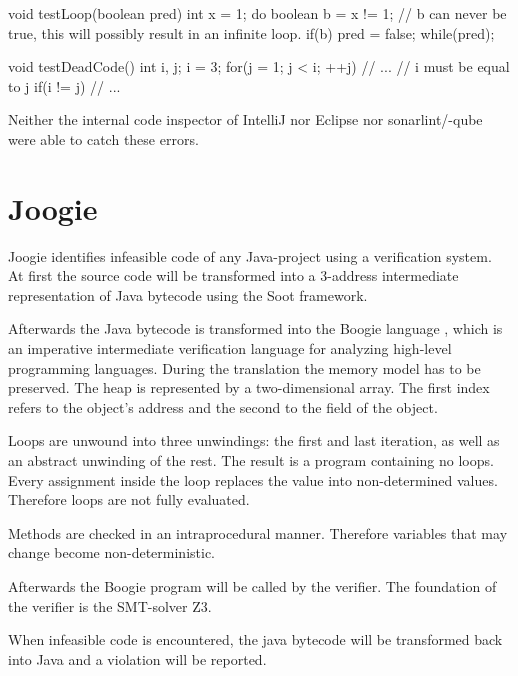 \begin{program}[h!]
	\begin{JavaCode}
void testLoop(boolean pred) {
	int x = 1;
	do {
		boolean b = x != 1;
		// b can never be true, this will possibly result in an infinite loop.
		if(b) {
			pred = false;
		}
	} while(pred);
}

void testDeadCode() {
	int i, j;
	i = 3;
	for(j = 1; j < i; ++j) {
		// ...
	}
	// i must be equal to j
	if(i != j) { 
		// ...
	}
}\end{JavaCode}
	\caption{Neither the internal code inspector of IntelliJ nor Eclipse nor sonarlint/-qube were able to catch these errors. }
	\label{code:Java sonarqube hard example}
\end{program}

\clearpage
\section{Joogie}
\label{sec:sca paper}
Joogie \cite{arltJoogieInfeasibleCode2012, arltJoogieJavaJimple2013} identifies infeasible code of any Java-project using a verification system. 
At first the source code will be transformed into a 3-address intermediate representation of Java bytecode using the Soot \cite{Soot} framework. 

Afterwards the Java bytecode is transformed into the Boogie language \cite{BoogieIntermediateVerification}, which is an imperative intermediate verification language for analyzing high-level programming languages.
During the translation the memory model has to be preserved. The heap is represented by a two-dimensional array. The first index refers to the object's address and the second to the field of the object.

Loops are unwound into three unwindings: the first and last iteration, as well as an abstract unwinding of the rest.
The result is a program containing no loops. Every assignment inside the loop replaces the value into non-determined values. Therefore loops are not fully evaluated.


Methods are checked in an intraprocedural manner. Therefore variables that may change become non-deterministic. 


Afterwards the Boogie program will be called by the verifier. 
The foundation of the verifier is the SMT-solver Z3.



When infeasible code is encountered, the java bytecode will be transformed back into Java and a violation will be reported.


